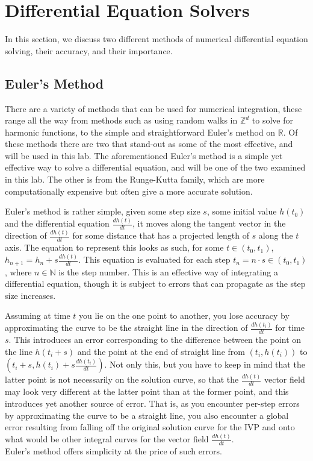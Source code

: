 \documentclass[11pt]{article}
\begin{document}
\section{Differential Equation Solvers}

In this section, we discuss two different methods of numerical differential equation solving, their accuracy, and their importance.

\subsection{Euler's Method}
  There are a variety of methods that can be used for numerical integration, these range all the way from methods such as using random walks in $\mathbb{Z}^d$ to solve for harmonic functions, to the simple and straightforward Euler's method on $\mathbb{R}$.
    Of these methods there are two that stand-out as some of the most effective, and will be used in this lab.
    The aforementioned Euler's method is a simple yet effective way to solve a differential equation, and will be one of the two examined in this lab.
    The other is from the Runge-Kutta family, which are more computationally expensive but often give a more accurate solution.

    Euler's method is rather simple, given some step size $s$, some initial value $h(t_0)$ and the differential equation $\frac{dh(t)}{dt}$, it moves along the tangent vector in the direction of $\frac{dh(t)}{dt}$ for some distance that has a projected length of $s$ along the $t$ axis.
    The equation to represent this looks as such, for some $t \in (t_0,t_1)$, $h_{n+1} = h_n + s\frac{dh(t)}{dt}$.
    This equation is evaluated for each step $t_n = n\cdot s \in (t_0,t_1)$, where $n \in \mathbb{N}$ is the step number.
    This is an effective way of integrating a differential equation, though it is subject to errors that can propagate as the step size increases.

    Assuming at time $t$ you lie on the one point to another, you lose accuracy by approximating the curve to be the straight line in the direction of $\frac{dh(t_i)}{dt}$ for time $s$.
    This introduces an error corresponding to the difference between the point on the line $h(t_i+s)$ and the point at the end of straight line from $(t_i, h(t_i))$ to $(t_i + s, h(t_i) + s\frac{dh(t_i)}{dt})$.
    Not only this, but you have to keep in mind that the latter point is not necessarily on the solution curve, so that the $\frac{dh(t)}{dt}$ vector field may look very different at the latter point than at the former point, and this introduces yet another source of error.
    That is, as you encounter per-step errors by approximating the curve to be a straight line, you also encounter a global error resulting from falling off the original solution curve for the IVP and onto what would be other integral curves for the vector field $\frac{dh(t)}{dt}$.\\
    Euler's method offers simplicity at the price of such errors.
\end{document}
